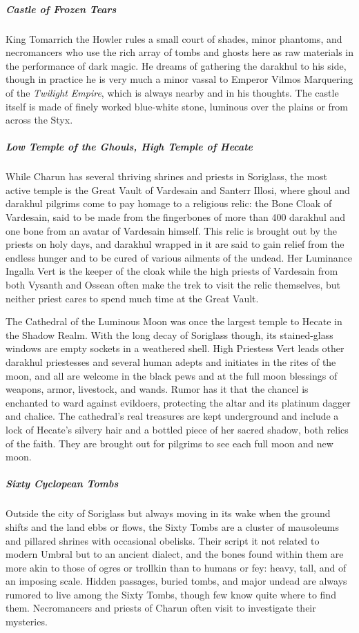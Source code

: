 \documentclass[10pt,a4paper,twoside,bg=print,twocolumn,openany,nodeprecatedcode]{dndbook}
\begin{document}
\subparagraph{Castle of Frozen Tears}
King Tomarrich the Howler rules a small court of shades, minor phantoms, and necromancers who use the rich array of tombs and ghosts here as raw materials in the performance of dark magic. He dreams of gathering the darakhul to his side, though in practice he is very much a minor vassal to Emperor Vilmos Marquering of the \textit{Twilight Empire}, which is always nearby and in his thoughts. The castle itself is made of finely worked blue-white stone, luminous over the plains or from across the Styx.

\subparagraph{Low Temple of the Ghouls, High Temple of Hecate}
While Charun has several thriving shrines and priests in Soriglass, the most active temple is the Great Vault of Vardesain and Santerr Illosi, where ghoul and darakhul pilgrims come to pay homage to a religious relic: the Bone Cloak of Vardesain, said to be made from the fingerbones of more than 400 darakhul and one bone from an avatar of Vardesain himself. This relic is brought out by the priests on holy days, and darakhul wrapped in it are said to gain relief from the endless hunger and to be cured of various ailments of the undead. Her Luminance Ingalla Vert is the keeper of the cloak while the high priests of Vardesain from both Vysanth and Ossean often make the trek to visit the relic themselves, but neither priest cares to spend much time at the Great Vault.

The Cathedral of the Luminous Moon was once the largest temple to Hecate in the Shadow Realm. With the long decay of Soriglass though, its stained-glass windows are empty sockets in a weathered shell. High Priestess Vert leads other darakhul priestesses and several human adepts and initiates in the rites of the moon, and all are welcome in the black pews and at the full moon blessings of weapons, armor, livestock, and wands. Rumor has it that the chancel is enchanted to ward against evildoers, protecting the altar and its platinum dagger and chalice. The cathedral's real treasures are kept underground and include a lock of Hecate's silvery hair and a bottled piece of her sacred shadow, both relics of the faith. They are brought out for pilgrims to see each full moon and new moon.

\subparagraph{Sixty Cyclopean Tombs}
Outside the city of Soriglass but always moving in its wake when the ground shifts and the land ebbs or flows, the Sixty Tombs are a cluster of mausoleums and pillared shrines with occasional obelisks. Their script it not related to modern Umbral but to an ancient dialect, and the bones found within them are more akin to those of ogres or trollkin than to humans or fey: heavy, tall, and of an imposing scale. Hidden passages, buried tombs, and major undead are always rumored to live among the Sixty Tombs, though few know quite where to find them. Necromancers and priests of Charun often visit to investigate their mysteries.
\end{document}
